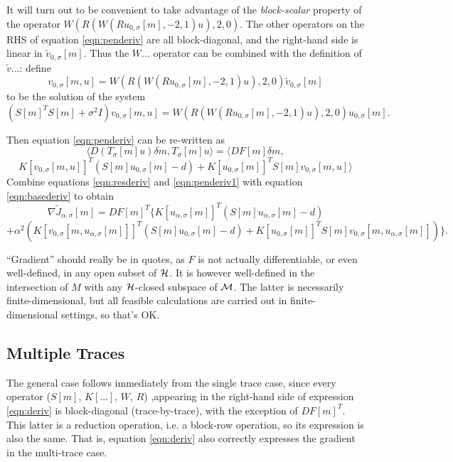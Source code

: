 It will turn out to be convenient to take advantage of the {\em
  block-scalar} property of the operator
$W(R(W(Ru_{0,\sigma}[m],-2,1)u),2,0)$. The other operators on the RHS
of equation \ref{eqn:penderiv} are all block-diagonal, and the
right-hand side is linear in $\tilde{v}_{0,\sigma}[m]$. Thus the
$W...$ operator can be combined with the definition of $\tilde{v}...$:
define
\[
  v_{0,\sigma}[m,u]=W(R(W(Ru_{0,\sigma}[m],-2,1)u),2,0) \tilde{v}_{0,\sigma}[m]
\]
to be the solution of the system
\begin{equation}
  \label{eqn:defv0}
  (S[m]^TS[m]+ \sigma^2I) v_{0,\sigma}[m,u] = W(R(W(Ru_{0,\sigma}[m],-2,1)u),2,0) u_{0,\sigma}[m].
\end{equation}

Then equation \ref{eqn:penderiv} can be re-written as
\[
  \langle D(T_{\sigma}[m]u)\delta m, T_{\sigma}[m]u\rangle = \langle DF[m]\delta m, 
\]
\begin{equation}
  \label{eqn:penderiv1}
   K[v_{0,\sigma}[m,u]]^T(S[m]u_{0,\sigma}[m]-d)
+
K[u_{0,\sigma}[m]]^T S[m]v_{0,\sigma}[m,u]\rangle
\end{equation}
Combine equations \ref{eqn:resderiv} and \ref{eqn:penderiv1} with
equation \ref{eqn:basederiv} to obtain
\[
  \nabla \tilde{J}_{\alpha,\sigma}[m] =
  DF[m]^T\{ K[u_{\alpha,\sigma}[m]]^T (S[m]u_{\alpha,\sigma}[m]-d)
\]
\begin{equation}
  \label{eqn:deriv}
  + \alpha^2 (
  K[v_{0,\sigma}[m, u_{\alpha,\sigma}[m]]]^T(S[m]u_{0,\sigma}[m]-d)
+ K[u_{0,\sigma}[m]]^T S[m]v_{0,\sigma}[m,u_{\alpha,\sigma}[m]]) \}.
\end{equation}

 ``Gradient'' should really be in quotes, as $F$ is not actually differentiable, or even well-defined, in any open subset of ${\cal H}$. It is however well-defined in the intersection of $M$ with any ${\cal H}$-closed subspace of ${\cal M}$. The latter is necessarily finite-dimensional, but all feasible calculations are carried out in finite-dimensional settings, so that's OK.
 
\subsection{Multiple Traces}
The general case follows immediately from the single trace case, since
every operator ($S[m]$, $K[...]$, $W$, $R$) ,appearing in the right-hand side of expression
\ref{eqn:deriv} is block-diagonal (trace-by-trace), with the exception
of $DF[m]^T$. This latter is a reduction operation, i.e. a block-row
operation, so its expression is also the same. That is, equation
\ref{eqn:deriv} also correctly expresses the gradient in the
multi-trace case.

